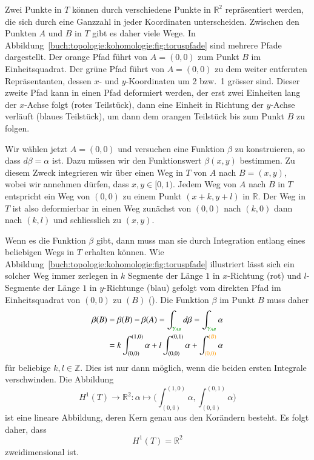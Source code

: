 Zwei Punkte in $T$ können durch verschiedene Punkte in
$\mathbb{R}^2$ repräsentiert werden, die sich durch eine Ganzzahl
in jeder Koordinaten unterscheiden.
Zwischen den Punkten $A$ und $B$ in $T$ gibt es daher viele Wege.
In Abbildung~\ref{buch:topologie:kohomologie:fig:toruspfade} sind
mehrere Pfade dargestellt.
Der orange Pfad führt von $A=(0,0)$ zum Punkt $B$ im Einheitsquadrat.
Der grüne Pfad führt von $A=(0,0)$ zu dem weiter entfernten
Repräsentanten, dessen $x$- und $y$-Koordinaten um 2 bzw.~1 grösser
sind.
Dieser zweite Pfad kann in einen Pfad deformiert werden, der erst
zwei Einheiten lang der $x$-Achse folgt ({\color{darkred}rotes}
Teilstück), dann eine Einheit in Richtung der $y$-Achse verläuft
({\color{blue}blaues} Teilstück), um dann dem {\color{orange}orangen}
Teilstück bis zum Punkt $B$ zu folgen.

Wir wählen jetzt $A=(0,0)$ und versuchen eine Funktion $\beta$ zu
konstruieren, so dass $d\beta =\alpha$ ist.
Dazu müssen wir den Funktionswert $\beta(x,y)$ bestimmen.
Zu diesem Zweck integrieren wir über einen Weg in $T$ von $A$ nach
$B=(x,y)$, wobei wir annehmen dürfen, dass $x,y\in[0,1)$.
Jedem Weg von $A$ nach $B$ in $T$ entspricht ein Weg von $(0,0)$
zu einem Punkt $(x+k,y+l)$ in $\mathbb{R}$.
Der Weg in $T$ ist also deformierbar in einen Weg
zunächst von $(0,0)$ nach $(k,0)$ dann nach $(k,l)$ und schliesslich
zu $(x,y)$.

Wenn es die Funktion $\beta$ gibt, dann muss man sie durch Integration
entlang eines beliebigen Wegs in $T$ erhalten können.
Wie Abbildung~\ref{buch:topologie:kohomologie:fig:toruspfade}
illustriert lässt sich ein solcher Weg immer zerlegen in 
$k$ Segmente der Länge $1$ in $x$-Richtung ({\color{darkred}rot})
und $l$-Segmente der Länge $1$ in $y$-Richtunge ({\color{blue}blau})
gefolgt vom direkten Pfad im Einheitsquadrat von $(0,0)$ zu $(B)$
({\color{orange}}).
Die Funktion $\beta$ im Punkt $B$ muss daher
\begin{align*}
\beta(B)
&=
\beta(B) - \beta(A)
=
\int_{{\color{darkgreen}\gamma_{AB}}} d\beta
=
\int_{{\color{darkgreen}\gamma_{AB}}} \alpha
\\
&=
k\int_{(0,0)}^{(1,0)}\alpha
+
l\int_{(0,0)}^{(0,1)}\alpha
+
\int_{(0,0)}^{\color{orange}(B)}\alpha
\end{align*}
für beliebige $k,l\in\mathbb{Z}$.
Dies ist nur dann möglich, wenn die beiden ersten Integrale verschwinden.
Die Abbildung
\[
H^1(T)
\to
\mathbb{R}^2
:
\alpha
\mapsto
\biggl(
\int_{(0,0)}^{(1,0)}
\alpha,
\int_{(0,0)}^{(0,1)}
\alpha
\biggr)
\]
ist eine lineare Abbildung, deren Kern genau aus den Korändern besteht.
Es folgt daher, dass
\[
H^1(T) = \mathbb{R}^2
\]
zweidimensional ist.

